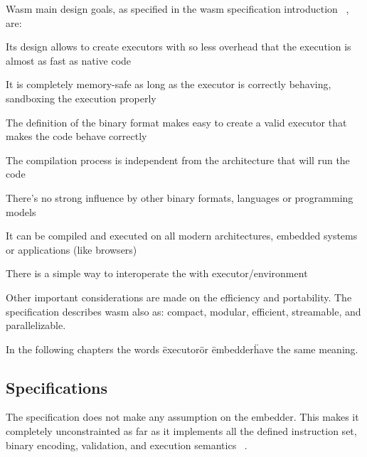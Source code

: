 \documentclass[../main.tex]{subfiles}
\begin{document}
Wasm main design goals, as specified in the wasm specification introduction ~\cite{wasm-core-spec}, are:
\begin{description}[font=$\bullet$ \scshape\bfseries]
  \item[Fast] Its design allows to create executors with so less overhead that the execution is almost as fast as native code
  \item[Safe] It is completely memory-safe as long as the executor is correctly behaving, sandboxing the execution properly
  \item[Well-defined] The definition of the binary format makes easy to create a valid executor that makes the code behave correctly
  \item[Hardware-independent] The compilation process is independent from the architecture that will run the code
  \item[Language-independent] There's no strong influence by other binary formats, languages or programming models


  \item[Platform-independent] It can be compiled and executed on all modern architectures, embedded systems or applications (like browsers)
  \item[Open] There is a simple way to interoperate the with executor/environment
\end{description}

Other important considerations are made on the efficiency and portability. The specification describes wasm also as: compact, modular, efficient, streamable, and parallelizable.


In the following chapters the words \"executor\" or \"embedder\" have the same meaning.

\subsection{Specifications}

The specification does not make any assumption on the embedder. This makes it completely unconstrainted as far as it implements all the defined instruction set, binary encoding, validation, and execution semantics ~\cite{wasm-core-spec}.
\end{document}
